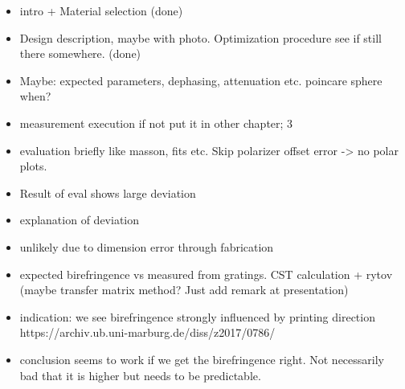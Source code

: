 
\begin{itemize}
    \item intro + Material selection (done)
    \item Design description, maybe with photo. Optimization procedure see if still there somewhere. (done)
    \item Maybe: expected parameters, dephasing, attenuation etc. poincare sphere when?
    \item measurement execution if not put it in other chapter; 3
    \item evaluation briefly like masson, fits etc. Skip polarizer offset error -> no polar plots.
    \item Result of eval shows large deviation
    \item explanation of deviation
    \item unlikely due to dimension error through fabrication
    \item expected birefringence vs measured from gratings. CST calculation + rytov (maybe transfer matrix method? Just add remark at presentation)
    \item indication: we see birefringence strongly influenced by printing direction https://archiv.ub.uni-marburg.de/diss/z2017/0786/ 
    \item conclusion seems to work if we get the birefringence right. Not necessarily bad that it is higher but needs to be predictable. 
\end{itemize}




